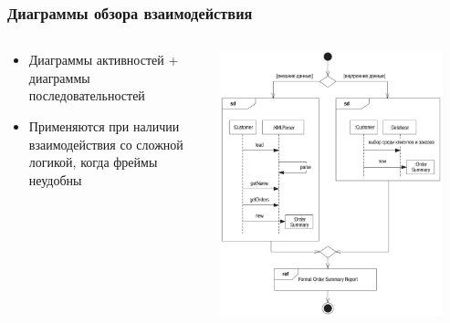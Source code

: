 \documentclass{../../slides-style}
\begin{document}
    \begin{frame}
        \frametitle{Диаграммы обзора взаимодействия}
        \begin{columns}
            \begin{column}{0.5\textwidth}
                \begin{itemize}
                    \item Диаграммы активностей + диаграммы последовательностей
                    \item Применяются при наличии взаимодействия со сложной логикой, когда фреймы неудобны
                \end{itemize}
            \end{column}
            \begin{column}{0.5\textwidth}
                \begin{center}
                    \includegraphics[width=0.9\textwidth]{interactionOverviewDiagrams.png}
                \end{center}
            \end{column}
        \end{columns}
    \end{frame}
\end{document}
